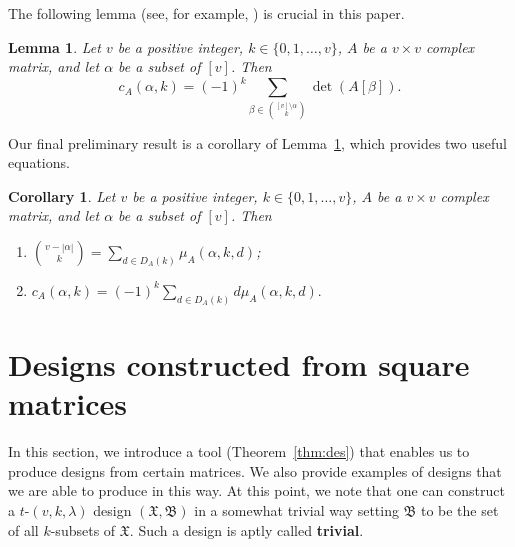\documentclass[11pt]{article}
\newtheorem{corollary}[theorem]{Corollary}
\newtheorem{lemma}[theorem]{Lemma}
\begin{document}
The following lemma (see, for example, \cite[Eq.(1,2,13), Page 53]{HJ}) is crucial in this paper. 
\begin{lemma}\label{lem:coef}
Let $v$ be a positive integer, $k \in \{0,1,\dots,v\}$, $A$ be a $v\times v$ complex matrix, and let $\alpha$ be a subset of $[v]$. 
Then
\begin{equation*}
    c_A(\alpha,k) = (-1)^{k}\sum_{\beta \in \binom{[v]\setminus \alpha}{k} }\det (A[\beta]).
\end{equation*}
\end{lemma}

Our final preliminary result is a corollary of Lemma~\ref{lem:coef}, which provides two useful equations.

\begin{corollary}\label{cor:mu}
Let $v$ be a positive integer, $k \in \{0,1,\dots,v\}$, $A$ be a $v\times v$ complex matrix, and let $\alpha$ be a subset of $[v]$. 
Then
\begin{enumerate}
    \item $\displaystyle \binom{v-|\alpha|}{k} = \sum_{d\in D_A(k)}\mu_A(\alpha,k,d)$;
    \item  
     $\displaystyle c_A(\alpha,k)    =(-1)^{k}\sum_{d\in D_A(k)}d\mu_A(\alpha,k,d).$

\end{enumerate}
\end{corollary}

\section{Designs constructed from square matrices}\label{sec:des}

In this section, we introduce a tool (Theorem~\ref{thm:des}) that enables us to produce designs from certain matrices.
We also provide examples of designs that we are able to produce in this way.
At this point, we note that one can construct a $t$-$(v,k,\lambda)$ design $(\mathfrak X,\mathfrak B)$ in a somewhat trivial way setting $\mathfrak B$ to be the set of all $k$-subsets of $\mathfrak X$.
Such a design is aptly called \textbf{trivial}.
\end{document}
